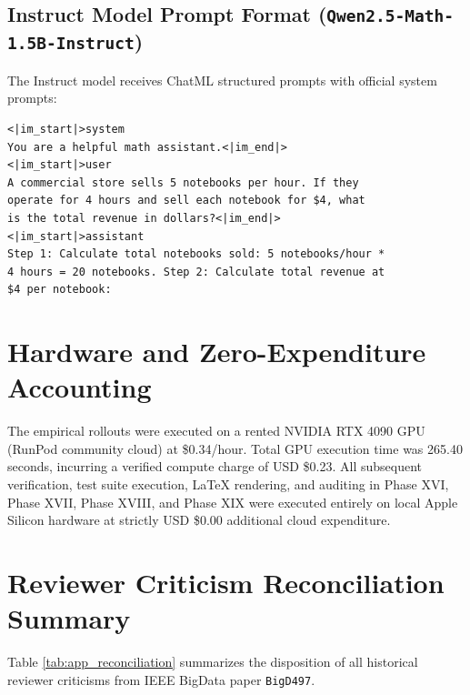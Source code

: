\documentclass[11pt,letterpaper]{article}
\newcommand{\modelinstruct}{\texttt{Qwen2.5-Math-1.5B-Instruct}}
\begin{document}
\subsection{Instruct Model Prompt Format (\modelinstruct)}
The Instruct model receives ChatML structured prompts with official system prompts:
\begin{verbatim}
<|im_start|>system
You are a helpful math assistant.<|im_end|>
<|im_start|>user
A commercial store sells 5 notebooks per hour. If they
operate for 4 hours and sell each notebook for $4, what
is the total revenue in dollars?<|im_end|>
<|im_start|>assistant
Step 1: Calculate total notebooks sold: 5 notebooks/hour *
4 hours = 20 notebooks. Step 2: Calculate total revenue at
$4 per notebook:
\end{verbatim}

\section{Hardware and Zero-Expenditure Accounting}
\label{app:compute}
The empirical rollouts were executed on a rented NVIDIA RTX 4090 GPU (RunPod community cloud) at \$0.34/hour. Total GPU execution time was 265.40 seconds, incurring a verified compute charge of USD \$0.23. All subsequent verification, test suite execution, LaTeX rendering, and auditing in Phase XVI, Phase XVII, Phase XVIII, and Phase XIX were executed entirely on local Apple Silicon hardware at strictly USD \$0.00 additional cloud expenditure.

\section{Reviewer Criticism Reconciliation Summary}
\label{app:reconciliation}
Table \ref{tab:app_reconciliation} summarizes the disposition of all historical reviewer criticisms from IEEE BigData paper \texttt{BigD497}.
\end{document}
